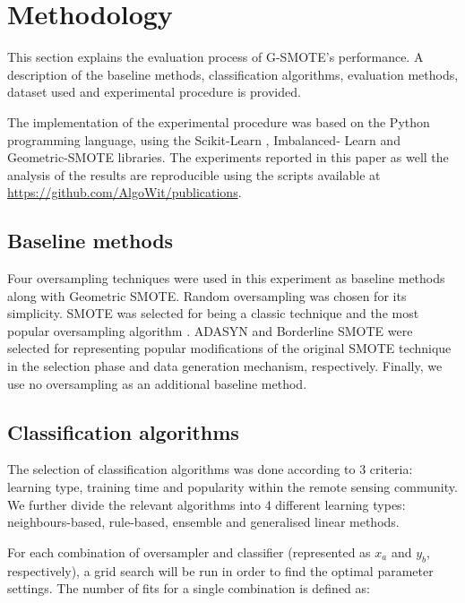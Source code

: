 \documentclass[parskip=full]{scrartcl}
\begin{document}
\section{Methodology}

This section explains the evaluation process of G-SMOTE's performance. A
description of the baseline methods, classification algorithms, evaluation
methods, dataset used and experimental procedure is provided.

The implementation of the experimental procedure was based on the Python
programming language, using the Scikit-Learn \cite{Pedregosa2011}, Imbalanced-
Learn \cite{JMLR:v18:16-365} and Geometric-SMOTE \cite{Douzas2019} libraries.
The experiments reported in this paper as well the analysis of the results are
reproducible using the scripts available at \url{https://github.com/AlgoWit/publications}.

\subsection{Baseline methods}

Four oversampling techniques were used in this experiment as baseline methods
along with Geometric SMOTE. Random oversampling was chosen for its simplicity.
SMOTE was selected for being a classic technique and the most popular
oversampling algorithm \cite{Douzas2019}. ADASYN \cite{HaiboHe2008} and
Borderline SMOTE \cite{Han2005} were selected for representing popular
modifications of the original SMOTE technique in the selection phase and data
generation mechanism, respectively. Finally, we use no oversampling as an
additional baseline method.

\subsection{Classification algorithms}

The selection of classification algorithms was done according to 3 criteria:
learning type, training time and popularity within the remote sensing
community. We further divide the relevant algorithms into 4 different learning
types: neighbours-based, rule-based, ensemble and generalised linear methods.

For each combination of oversampler and classifier (represented as $x_a$ and
$y_b$, respectively), a grid search will be run in order to find the optimal
parameter settings. The number of fits for a single combination  is defined as:
\end{document}
